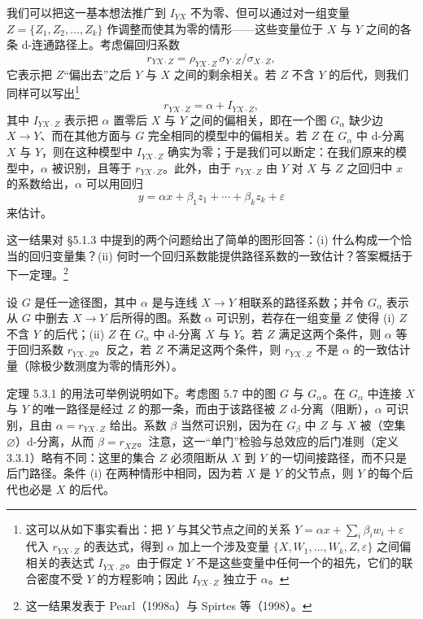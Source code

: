 我们可以把这一基本想法推广到 $I_{YX}$ 不为零、但可以通过对一组变量 $Z=\{Z_1,Z_2,\dots,Z_k\}$ 作调整而使其为零的情形——这些变量位于 $X$ 与 $Y$ 之间的各条 d-连通路径上。考虑偏回归系数
\[
r_{YX\cdot Z}=\rho_{YX\cdot Z}\,\sigma_{Y\cdot Z}/\sigma_{X\cdot Z},
\]
它表示把 $Z$“偏出去”之后 $Y$ 与 $X$ 之间的剩余相关。若 $Z$ 不含 $Y$ 的后代，则我们同样可以写出\footnote{这可以从如下事实看出：把 $Y$ 与其父节点之间的关系 $Y=\alpha x+\sum_i\beta_iw_i+\varepsilon$ 代入 $r_{YX\cdot Z}$ 的表达式，得到 $\alpha$ 加上一个涉及变量 $\{X,W_1,\dots,W_k,Z,\varepsilon\}$ 之间偏相关的表达式 $I_{YX\cdot Z}$。由于假定 $Y$ 不是这些变量中任何一个的祖先，它们的联合密度不受 $Y$ 的方程影响；因此 $I_{YX\cdot Z}$ 独立于 $\alpha$。}
\begin{equation}
r_{YX\cdot Z}=\alpha+I_{YX\cdot Z},
\end{equation}
其中 $I_{YX\cdot Z}$ 表示把 $\alpha$ 置零后 $X$ 与 $Y$ 之间的偏相关，即在一个图 $G_\alpha$ 缺少边 $X\to Y$、而在其他方面与 $G$ 完全相同的模型中的偏相关。若 $Z$ 在 $G_\alpha$ 中 d-分离 $X$ 与 $Y$，则在这种模型中 $I_{YX\cdot Z}$ 确实为零；于是我们可以断定：在我们原来的模型中，$\alpha$ 被识别，且等于 $r_{YX\cdot Z}$。此外，由于 $r_{YX\cdot Z}$ 由 $Y$ 对 $X$ 与 $Z$ 之回归中 $x$ 的系数给出，$\alpha$ 可以用回归
\[
y=\alpha x+\beta_1z_1+\cdots+\beta_kz_k+\varepsilon
\]
来估计。

这一结果对 \S 5.1.3 中提到的两个问题给出了简单的图形回答：(i) 什么构成一个恰当的回归变量集？(ii) 何时一个回归系数能提供路径系数的一致估计？答案概括于下一定理。\footnote{这一结果发表于 Pearl（1998a）与 Spirtes 等（1998）。}

\begin{theorem}[直接效应的单门准则]
设 $G$ 是任一途径图，其中 $\alpha$ 是与连线 $X\to Y$ 相联系的路径系数；并令 $G_\alpha$ 表示从 $G$ 中删去 $X\to Y$ 后所得的图。系数 $\alpha$ 可识别，若存在一组变量 $Z$ 使得 (i) $Z$ 不含 $Y$ 的后代；(ii) $Z$ 在 $G_\alpha$ 中 d-分离 $X$ 与 $Y$。若 $Z$ 满足这两个条件，则 $\alpha$ 等于回归系数 $r_{YX\cdot Z}$。反之，若 $Z$ 不满足这两个条件，则 $r_{YX\cdot Z}$ 不是 $\alpha$ 的一致估计量（除极少数测度为零的情形外）。
\end{theorem}

定理 5.3.1 的用法可举例说明如下。考虑图 5.7 中的图 $G$ 与 $G_\alpha$。在 $G_\alpha$ 中连接 $X$ 与 $Y$ 的唯一路径是经过 $Z$ 的那一条，而由于该路径被 $Z$ d-分离（阻断），$\alpha$ 可识别，且由 $\alpha=r_{YX\cdot Z}$ 给出。系数 $\beta$ 当然可识别，因为在 $G_\beta$ 中 $Z$ 与 $X$ 被（空集 $\varnothing$）d-分离，从而 $\beta=r_{XZ}$。注意，这一“单门”检验与总效应的后门准则（定义 3.3.1）略有不同：这里的集合 $Z$ 必须阻断从 $X$ 到 $Y$ 的一切间接路径，而不只是后门路径。条件 (i) 在两种情形中相同，因为若 $X$ 是 $Y$ 的父节点，则 $Y$ 的每个后代也必是 $X$ 的后代。

